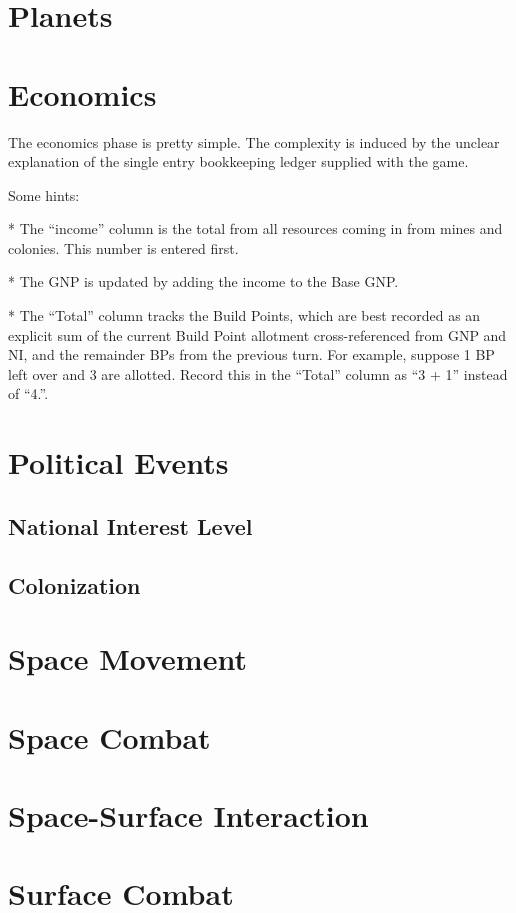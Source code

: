 \documentclass[10pt]{article}
\begin{document}
\begin{multicols}{2}
\section{Planets}
\section{Economics}


The economics phase is pretty simple. The complexity is induced
by the unclear explanation of the single entry bookkeeping ledger
supplied with the game.

Some hints:

* The ``income'' column is the total from all resources coming in from mines
and colonies. This number is entered first.

* The GNP is updated by adding the income to the Base GNP.

* The ``Total'' column tracks the Build Points, which are best recorded
as an explicit sum of the current Build Point allotment cross-referenced
from GNP and NI, and the remainder BPs from the previous turn. For example,
suppose 1 BP left over and 3 are allotted. Record this in the ``Total'' column
as ``3 + 1'' instead of ``4.''.

\section{Political Events}
\subsection{National Interest Level}
\subsection{Colonization}

\section{Space Movement}

\section{Space Combat}

\section{Space-Surface Interaction}

\section{Surface Combat}


\end{multicols}
\end{document}
